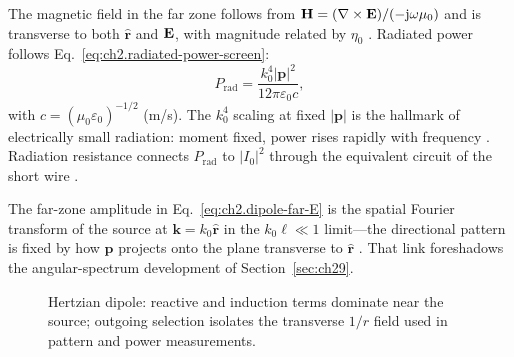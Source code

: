 The magnetic field in the far zone follows from $\mathbf{H}=(\nabla\times\mathbf{E})/(-\mathrm{j}\omega\mu_0)$ and is transverse to both $\hat{\mathbf{r}}$ and $\mathbf{E}$, with magnitude related by $\eta_0$ \cite{stratton1941}. Radiated power follows Eq.~\eqref{eq:ch2.radiated-power-screen}:
\begin{equation}
\label{eq:ch2.dipole-P-rad}
P_{\mathrm{rad}}=\frac{k_0^4|\mathbf{p}|^2}{12\pi\varepsilon_0 c},
\end{equation}
with $c=(\mu_0\varepsilon_0)^{-1/2}$ (m/s). The $k_0^4$ scaling at fixed $|\mathbf{p}|$ is the hallmark of electrically small radiation: moment fixed, power rises rapidly with frequency \cite{poynting1884,harrington2001}. Radiation resistance connects $P_{\mathrm{rad}}$ to $|I_0|^2$ through the equivalent circuit of the short wire \cite{harrington2001}.

The far-zone amplitude in Eq.~\eqref{eq:ch2.dipole-far-E} is the spatial Fourier transform of the source at $\mathbf{k}=k_0\hat{\mathbf{r}}$ in the $k_0\ell\ll1$ limit---the directional pattern is fixed by how $\mathbf{p}$ projects onto the plane transverse to $\hat{\mathbf{r}}$ \cite{jackson1999}. That link foreshadows the angular-spectrum development of Section~\ref{sec:ch29}.

\begin{figure}[t]
\centering
{}
\caption{Hertzian dipole: reactive and induction terms dominate near the source; outgoing selection isolates the transverse $1/r$ field used in pattern and power measurements.}
\label{fig:ch2.hertzian-dipole-regimes}
\end{figure}
